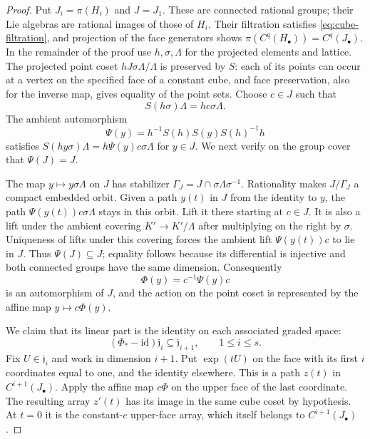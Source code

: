 \begin{proof}
Put $J_i=\pi(H_i)$ and $J=J_1$.  These are connected rational groups;
their Lie algebras are rational images of those of $H_i$.  Their
filtration satisfies \eqref{eq:cube-filtration}, and projection of the
face generators shows
$\pi(C^q(H_\bullet))=C^q(J_\bullet)$.
In the remainder of the proof use $h,\sigma,\Lambda$ for the projected
elements and lattice.  The projected point coset
$hJ\sigma\Lambda/\Lambda$ is preserved by $S$: each of its points can
occur at a vertex on the specified face of a constant cube, and face
preservation, also for the inverse map, gives equality of the point
sets.  Choose $c\in J$ such that
\begin{equation}
 S(h\sigma)\Lambda=hc\sigma\Lambda.
 \label{eq:affine-basepoint}
\end{equation}
The ambient automorphism
\[
 \Psi(y)=h^{-1}S(h)S(y)S(h)^{-1}h
\]
satisfies
$S(hy\sigma)\Lambda=h\Psi(y)c\sigma\Lambda$ for $y\in J$.
We next verify on the group cover that $\Psi(J)=J$.

The map $y\mapsto y\sigma\Lambda$ on $J$ has stabilizer
$\Gamma_J=J\cap\sigma\Lambda\sigma^{-1}$.  Rationality makes
$J/\Gamma_J$ a compact embedded orbit.  Given a path $y(t)$ in $J$
from the identity to $y$, the path
$\Psi(y(t))c\sigma\Lambda$ stays in this orbit.  Lift it there starting
at $c\in J$.  It is also a lift under the ambient covering
$K'\to K'/\Lambda$ after multiplying on the right by $\sigma$.
Uniqueness of lifts under this covering forces the ambient lift
$\Psi(y(t))c$ to lie in $J$.  Thus $\Psi(J)\subseteq J$; equality
follows because its differential is injective and both connected groups
have the same dimension.  Consequently
\[
 \Phi(y)=c^{-1}\Psi(y)c
\]
is an automorphism of $J$, and the action on the point coset is represented
by the affine map $y\mapsto c\Phi(y)$.

We claim that its linear part is the identity on each associated graded
space:
\begin{equation}
 (\Phi_*-\mathrm{id})\mathfrak j_i\subseteq\mathfrak j_{i+1},
 \qquad 1\leq i\leq s.
 \label{eq:face-graded-identity}
\end{equation}
Fix $U\in\mathfrak j_i$ and work in dimension $i+1$.  Put
$\exp(tU)$ on the face with its first $i$ coordinates equal to one,
and the identity elsewhere.  This is a path $z(t)$ in
$C^{i+1}(J_\bullet)$.  Apply the affine map $c\Phi$ on the upper face
of the last coordinate.  The resulting array $z'(t)$ has its image
in the same cube coset by hypothesis.  At $t=0$ it is the constant-$c$
upper-face array, which itself belongs to $C^{i+1}(J_\bullet)$.


\end{proof}
